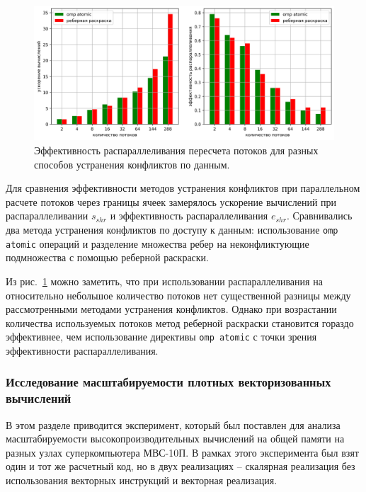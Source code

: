 \begin{figure}[ht]
\centering
\includegraphics[width=1.0\textwidth]{fig/par_edge_col_11-chart.png}
\singlespacing
{}\caption{Эффективность распараллеливания пересчета потоков для разных способов устранения конфликтов по данным.}
\label{fig:text_3_edge_coloring_11}
\end{figure}

Для сравнения эффективности методов устранения конфликтов при параллельном расчете потоков через границы ячеек замерялось ускорение вычислений при распараллеливании $s_{shr}$ и эффективность распараллеливания $e_{shr}$.
Сравнивались два метода устранения конфликтов по доступу к данным: использование \texttt{omp atomic} операций и разделение множества ребер на неконфликтующие подмножества с помощью реберной раскраски.

Из рис.~\ref{fig:text_3_edge_coloring_11} можно заметить, что при использовании распараллеливания на относительно небольшое количество потоков нет существенной разницы между рассмотренными методами устранения конфликтов.
Однако при возрастании количества используемых потоков метод реберной раскраски становится гораздо эффективнее, чем использование директивы \texttt{omp atomic} с точки зрения эффективности распараллеливания.

\subsubsection{Исследование масштабируемости плотных векторизованных вычислений}

В этом разделе приводится эксперимент, который был поставлен для анализа масштабируемости высокопроизводительных вычислений на общей памяти на разных узлах суперкомпьютера МВС-10П.
В рамках этого эксперимента был взят один и тот же расчетный код, но в двух реализациях -- скалярная реализация без использования векторных инструкций и векторная реализация.

